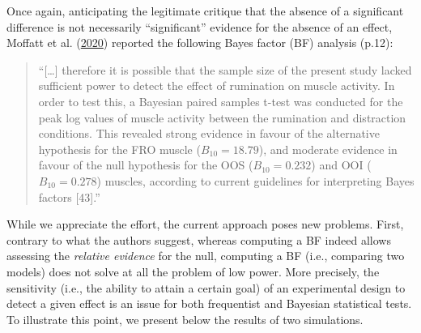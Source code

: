 \documentclass[
  english,
  man, donotrepeattitle,floatsintext]{apa6}
\begin{document}
Once again, anticipating the legitimate critique that the absence of a significant difference is not necessarily ``significant'' evidence for the absence of an effect, Moffatt et al. (\protect\hyperlink{ref-moffatt_inner_2020}{2020}) reported the following Bayes factor (BF) analysis (p.12):

\begin{quote}
``{[}\ldots{]} therefore it is possible that the sample size of the present study lacked sufficient power to detect the effect of rumination on muscle activity. In order to test this, a Bayesian paired samples t-test was conducted for the peak log values of muscle activity between the rumination and distraction conditions. This revealed strong evidence in favour of the alternative hypothesis for the FRO muscle (\(B_{10} = 18.79\)), and moderate evidence in favour of the null hypothesis for the OOS (\(B_{10} = 0.232\)) and OOI (\(B_{10} = 0.278\)) muscles, according to current guidelines for interpreting Bayes factors {[}43{]}.''
\end{quote}

While we appreciate the effort, the current approach poses new problems. First, contrary to what the authors suggest, whereas computing a BF indeed allows assessing the \emph{relative evidence} for the null, computing a BF (i.e., comparing two models) does not solve at all the problem of low power. More precisely, the sensitivity (i.e., the ability to attain a certain goal) of an experimental design to detect a given effect is an issue for both frequentist and Bayesian statistical tests. To illustrate this point, we present below the results of two simulations.
\end{document}

